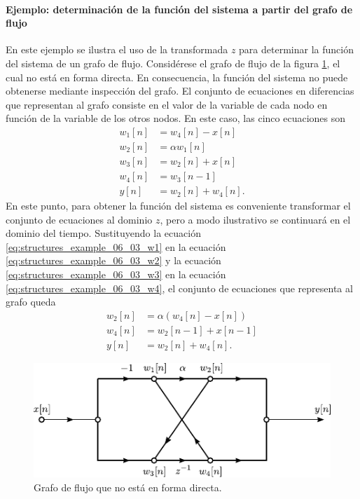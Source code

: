 \documentclass[a4paper]{report}
\begin{document}
\paragraph{Ejemplo: determinación de la función del sistema a partir del grafo de flujo} En este ejemplo se ilustra  el uso de la transformada \(z\) para determinar la función del sistema de un grafo de flujo. Considérese el grafo de flujo de la figura \ref{fig:example_06_03_flow_graph_non_direct}, el cual no está en forma directa. En consecuencia, la función del sistema no puede obtenerse mediante inspección del grafo. El conjunto de ecuaciones en diferencias que representan al grafo consiste en el valor de la variable de cada nodo en función de la variable de los otros nodos. En este caso, las cinco ecuaciones son
\begin{align}
 w_1[n]&=w_4[n]-x[n]\label{eq:structures_example_06_03_w1}\\
 w_2[n]&=\alpha w_1[n]\label{eq:structures_example_06_03_w2}\\
 w_3[n]&=w_2[n]+x[n]\label{eq:structures_example_06_03_w3}\\
 w_4[n]&=w_3[n-1]\label{eq:structures_example_06_03_w4}\\
 y[n]&=w_2[n]+w_4[n]\label{eq:structures_example_06_03_y}.
\end{align}
En este punto, para obtener la función del sistema es conveniente transformar el conjunto de ecuaciones al dominio \(z\), pero a modo ilustrativo se continuará en el dominio del tiempo. Sustituyendo la ecuación \ref{eq:structures_example_06_03_w1} en la ecuación \ref{eq:structures_example_06_03_w2} y la ecuación \ref{eq:structures_example_06_03_w3} en la ecuación \ref{eq:structures_example_06_03_w4}, el conjunto de ecuaciones que representa al grafo queda
\begin{align}
 w_2[n]&=\alpha(w_4[n]-x[n])\label{eq:structures_example_06_03_w2_2}\\
 w_4[n]&=w_2[n-1]+x[n-1]\label{eq:structures_example_06_03_w4_2}\\
 y[n]&=w_2[n]+w_4[n]\label{eq:structures_example_06_03_y_2}.
\end{align}
\begin{figure}[!htb]
 \begin{minipage}[c]{0.65\textwidth}
  \includegraphics[width=\textwidth]{figuras/example_06_03_flow_graph_non_direct.pdf}
 \end{minipage}\hfill
 \begin{minipage}[c]{0.25\textwidth}
  \caption{
   Grafo de flujo que no está en forma directa. 
   }\label{fig:example_06_03_flow_graph_non_direct}
 \end{minipage}
\end{figure} 
\end{document}
